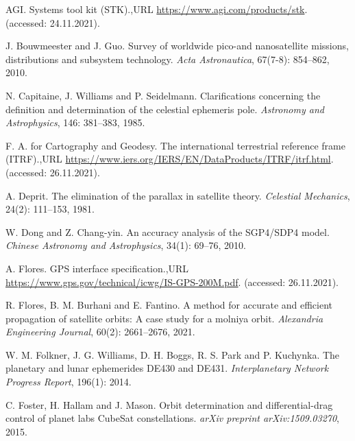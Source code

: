 \hypertarget{refs}{}
\begin{CSLReferences}{1}{0}
\leavevmode{}%
AGI. Systems tool kit (STK).,URL \url{https://www.agi.com/products/stk}. (accessed: 24.11.2021).

\leavevmode{}%
J. Bouwmeester and J. Guo. Survey of worldwide pico-and nanosatellite missions, distributions and subsystem technology. \emph{Acta Astronautica}, 67(7-8): 854--862, 2010.

\leavevmode{}%
N. Capitaine, J. Williams and P. Seidelmann. Clarifications concerning the definition and determination of the celestial ephemeris pole. \emph{Astronomy and Astrophysics}, 146: 381--383, 1985.

\leavevmode{}%
F. A. for Cartography and Geodesy. The international terrestrial reference frame (ITRF).,URL \url{https://www.iers.org/IERS/EN/DataProducts/ITRF/itrf.html}. (accessed: 26.11.2021).

\leavevmode{}%
A. Deprit. The elimination of the parallax in satellite theory. \emph{Celestial Mechanics}, 24(2): 111--153, 1981.

\leavevmode{}%
W. Dong and Z. Chang-yin. An accuracy analysis of the SGP4/SDP4 model. \emph{Chinese Astronomy and Astrophysics}, 34(1): 69--76, 2010.

\leavevmode{}%
A. Flores. GPS interface specification.,URL \url{https://www.gps.gov/technical/icwg/IS-GPS-200M.pdf}. (accessed: 26.11.2021).

\leavevmode{}%
R. Flores, B. M. Burhani and E. Fantino. A method for accurate and efficient propagation of satellite orbits: A case study for a molniya orbit. \emph{Alexandria Engineering Journal}, 60(2): 2661--2676, 2021.

\leavevmode{}%
W. M. Folkner, J. G. Williams, D. H. Boggs, R. S. Park and P. Kuchynka. The planetary and lunar ephemerides DE430 and DE431. \emph{Interplanetary Network Progress Report}, 196(1): 2014.

\leavevmode{}%
C. Foster, H. Hallam and J. Mason. Orbit determination and differential-drag control of planet labs CubeSat constellations. \emph{arXiv preprint arXiv:1509.03270}, 2015.


\end{CSLReferences}
